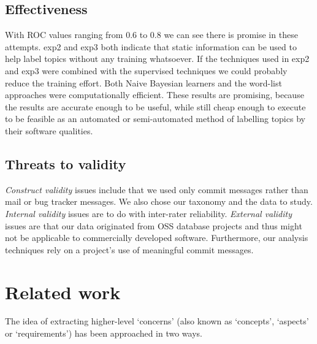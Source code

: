 \documentclass[]{sig-alternate}
\begin{document}
\subsection{Effectiveness}


With ROC values ranging from $0.6$ to $0.8$ we can see there is promise in these attempts. \textsf{exp2} and \textsf{exp3} both indicate that static information can be used to help label topics without any training whatsoever. If the techniques used in \textsf{exp2} and \textsf{exp3} were combined with the supervised techniques we could probably reduce the training effort. 
Both Naive Bayesian learners and the word-list approaches were computationally efficient.  These results are promising, because the results are accurate enough to be useful, while still cheap enough to execute to be feasible as an automated or semi-automated method of labelling topics by their software qualities.


\subsection{Threats to validity}
\emph{Construct validity} issues include that we used only commit messages rather than mail or bug tracker messages. We also chose our taxonomy and the data to study. \emph{Internal validity} issues are to do with inter-rater reliability. \emph{External validity} issues are that our data originated from OSS database projects and thus might not be applicable to commercially developed software. Furthermore, our analysis techniques rely on a project's use of meaningful commit messages.


\section{Related work}

The idea of extracting higher-level `concerns' (also known as `concepts', `aspects' or `requirements') has been approached in two ways. 
\end{document}
